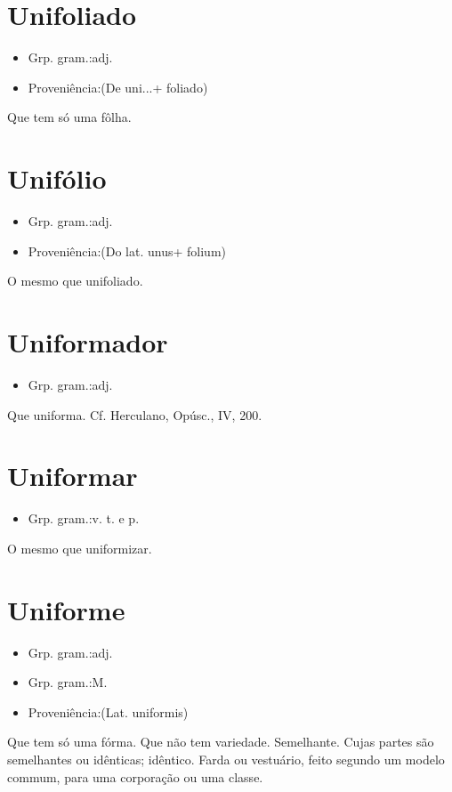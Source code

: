 \documentclass{article}
\begin{document}
\section{Unifoliado}
\begin{itemize}
\item {Grp. gram.:adj.}
\end{itemize}
\begin{itemize}
\item {Proveniência:(De \textunderscore uni...\textunderscore  + \textunderscore foliado\textunderscore )}
\end{itemize}
Que tem só uma fôlha.
\section{Unifólio}
\begin{itemize}
\item {Grp. gram.:adj.}
\end{itemize}
\begin{itemize}
\item {Proveniência:(Do lat. \textunderscore unus\textunderscore  + \textunderscore folium\textunderscore )}
\end{itemize}
O mesmo que \textunderscore unifoliado\textunderscore .
\section{Uniformador}
\begin{itemize}
\item {Grp. gram.:adj.}
\end{itemize}
Que uniforma. Cf. Herculano, \textunderscore Opúsc.\textunderscore , IV, 200.
\section{Uniformar}
\begin{itemize}
\item {Grp. gram.:v. t.  e  p.}
\end{itemize}
O mesmo que \textunderscore uniformizar\textunderscore .
\section{Uniforme}
\begin{itemize}
\item {Grp. gram.:adj.}
\end{itemize}
\begin{itemize}
\item {Grp. gram.:M.}
\end{itemize}
\begin{itemize}
\item {Proveniência:(Lat. \textunderscore uniformis\textunderscore )}
\end{itemize}
Que tem só uma fórma.
Que não tem variedade.
Semelhante.
Cujas partes são semelhantes ou idênticas; idêntico.
Farda ou vestuário, feito segundo um modelo commum, para uma corporação ou uma classe.
\end{document}
